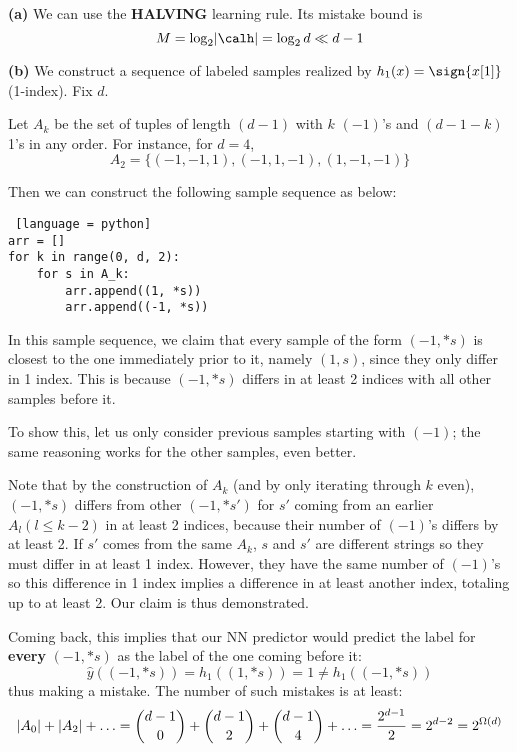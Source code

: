 \documentclass[a4paper, 12pt]{article}
\begin{document}
\begin{problem} [Problem 2]
\end{problem}
\begin{solution}
    \textbf{(a)} We can use the \textbf{HALVING} learning rule. Its mistake bound is \begin{equation*}
    M = \log_2 \abs{\calh} = \log_2 d \ll d - 1
    \end{equation*}

    \textbf{(b)} We construct a sequence of labeled samples realized by $h_1(x) = \sign{x[1]}$ (1-index). Fix $d$.

    Let $A_k$ be the set of tuples of length $(d-1)$ with $k$ $(-1)$'s and $(d-1-k)$ 1's in any order. For instance, for $d = 4$, \begin{equation*}
    A_2 = \{(-1, -1, 1), (-1, 1, -1), (1, -1, -1)\}
    \end{equation*}

    Then we can construct the following sample sequence as below:
\begin{lstlisting} [language = python]
arr = []
for k in range(0, d, 2):
    for s in A_k:
        arr.append((1, *s))
        arr.append((-1, *s))
\end{lstlisting}

In this sample sequence, we claim that every sample of the form $(-1, *s)$ is closest to the one immediately prior to it, namely $(1, s)$, since they only differ in 1 index. This is because $(-1, *s)$ differs in at least 2 indices with all other samples before it.

To show this, let us only consider previous samples starting with $(-1)$; the same reasoning works for the other samples, even better.

Note that by the construction of $A_k$ (and by only iterating through $k$ even), $(-1, *s)$ differs from other $(-1, *s')$ for $s'$ coming from an earlier $A_l (l \leq k-2)$ in at least 2 indices, because their number of $(-1)$'s differs by at least 2.  If $s'$ comes from the same $A_k$, $s$ and $s'$ are different strings so they must differ in at least 1 index. However, they have the same number of $(-1)$'s so this difference in 1 index implies a difference in at least another index, totaling up to at least 2. Our claim is thus demonstrated.

Coming back, this implies that our NN predictor would predict the label for \textbf{every} $(-1, *s)$ as the label of the one coming before it:
\begin{equation*}
    \hat{y}((-1, *s)) = h_1((1, *s)) = 1 \neq h_1((-1, *s))
\end{equation*}
thus making a mistake. The number of such mistakes is at least:
\begin{equation*}
\lvert A_0\rvert + \lvert A_2\rvert + \ldots = \binom{d-1}{0} + \binom{d-1}{2} + \binom{d-1}{4} + \ldots = \frac{2^{d-1}}{2} = 2^{d-2} = 2^{\Omega(d)}
\end{equation*}
\end{solution}
\end{document}
